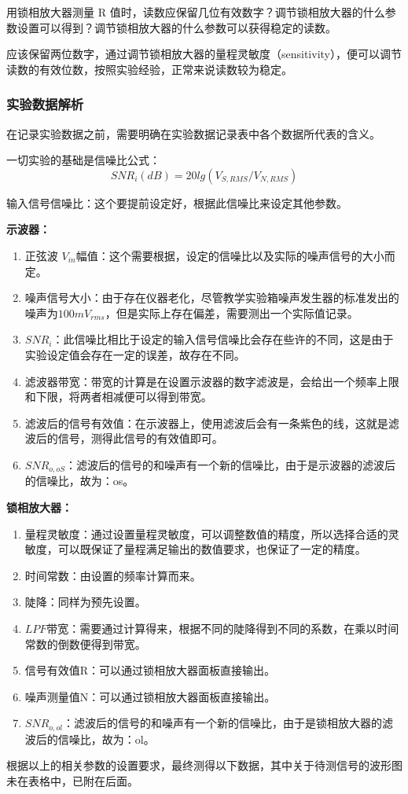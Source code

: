 \documentclass[dvipsnames, svgnames,a4paper,11pt]{article}
\begin{document}
	
\begin{question}
	用锁相放大器测量 R 值时，读数应保留几位有效数字？调节锁相放大器的什么参数设置可以得到？调节锁相放大器的什么参数可以获得稳定的读数。
\end{question}
应该保留两位数字，通过调节锁相放大器的量程灵敏度（sensitivity），便可以调节读数的有效位数，按照实验经验，正常来说读数较为稳定。
\subsubsection{实验数据解析}
在记录实验数据之前，需要明确在实验数据记录表中各个数据所代表的含义。

一切实验的基础是信噪比公式：$$ SNR_{i}(dB)=20lg(V_{S,RMS}/V_{N,RMS})$$

输入信号信噪比：这个要提前设定好，根据此信噪比来设定其他参数。

\textbf{示波器：}
\begin{enumerate}
	\item 正弦波 $V_{in}$幅值：这个需要根据，设定的信噪比以及实际的噪声信号的大小而定。
	\item 噪声信号大小：由于存在仪器老化，尽管教学实验箱噪声发生器的标准发出的噪声为$100mV_{rms}$，但是实际上存在偏差，需要测出一个实际值记录。
	\item $SNR_i$：此信噪比相比于设定的输入信号信噪比会存在些许的不同，这是由于实验设定值会存在一定的误差，故存在不同。

	\item 滤波器带宽：带宽的计算是在设置示波器的数字滤波是，会给出一个频率上限和下限，将两者相减便可以得到带宽。
	\item 滤波后的信号有效值：在示波器上，使用滤波后会有一条紫色的线，这就是滤波后的信号，测得此信号的有效值即可。
	\item $SNR_{o,oS}$：滤波后的信号的和噪声有一个新的信噪比，由于是示波器的滤波后的信噪比，故为：os。
\end{enumerate}
\textbf{锁相放大器：}
\begin{enumerate}
	\item 量程灵敏度：通过设置量程灵敏度，可以调整数值的精度，所以选择合适的灵敏度，可以既保证了量程满足输出的数值要求，也保证了一定的精度。
	\item 时间常数：由设置的频率计算而来。
	\item 陡降：同样为预先设置。
	\item $LPF$带宽：需要通过计算得来，根据不同的陡降得到不同的系数，在乘以时间常数的倒数便得到带宽。
	\item 信号有效值R：可以通过锁相放大器面板直接输出。
	\item 噪声测量值N：可以通过锁相放大器面板直接输出。
	\item  $SNR_{o,ol}$：滤波后的信号的和噪声有一个新的信噪比，由于是锁相放大器的滤波后的信噪比，故为：ol。
\end{enumerate}
根据以上的相关参数的设置要求，最终测得以下数据，其中关于待测信号的波形图未在表格中，已附在后面。
\end{document}
